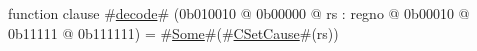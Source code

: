 function clause #\hyperref[zdecode]{decode}# (0b010010 @ 0b00000 @ rs : regno @    0b00010 @    0b11111 @ 0b111111) = #\hyperref[zSome]{Some}#(#\hyperref[zCSetCause]{CSetCause}#(rs))

